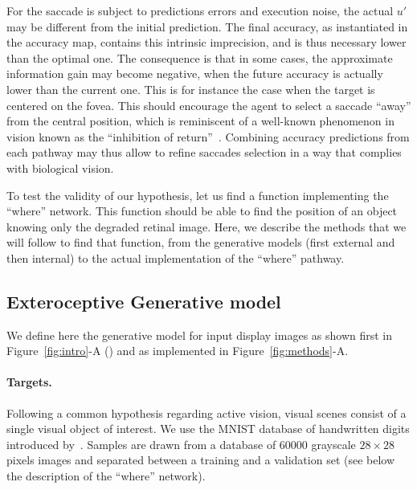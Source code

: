 For the saccade is subject to predictions errors and execution noise, the actual $u'$ may be different from the initial prediction. The final accuracy, as instantiated in the accuracy map, contains this intrinsic imprecision, and is thus necessary lower than the optimal one. The consequence is that in some cases, the approximate information gain may become negative, when the future accuracy is actually lower than the current one. This is for instance the case when the target is centered on the fovea.  This should encourage the agent to select a saccade ``away'' from the central position, which is reminiscent of a well-known phenomenon in vision known as the ``inhibition of return''~\citep{Itti01}. Combining accuracy predictions from each pathway may thus allow to refine saccades selection in a way that complies with biological vision.   


\fi
To test the validity of our hypothesis, let us find a %
function implementing the ``where'' network. This function should be able to find the position of an object knowing only the degraded retinal image. Here, we describe the methods that we will follow to find that function, from the generative models (first external and then internal) to the actual implementation of the ``where'' pathway. %



%
\subsection{Exteroceptive Generative model}
We define here the generative model for input display images as shown first in Figure~\ref{fig:intro}-A (\DIS ) and as implemented in Figure~\ref{fig:methods}-A.

\paragraph{Targets.} Following a common hypothesis regarding active vision, visual scenes consist of a single visual object of interest. We use the MNIST database of handwritten digits introduced by~\citep{Lecun1998}. %
Samples are drawn from a database of $60000$ grayscale $28\times 28$ pixels images and separated between a training and a validation set (see below the description of the ``where'' network).

